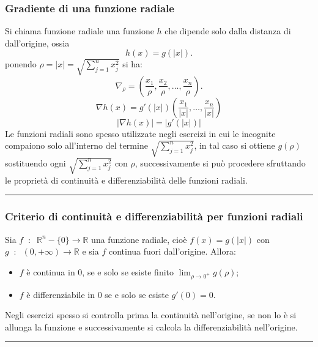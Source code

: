 \subsubsection*{Gradiente di una funzione radiale}
Si chiama funzione radiale una funzione $h$ che dipende solo dalla distanza di dall'origine, ossia
\[
    h(x) = g(|x|).
\]
ponendo $\rho = |x| = \sqrt{\sum_{j=1}^{n}x_j^2}$ si ha:
\[
    \nabla_\rho = ( \frac{x_1}{\rho}, \frac{x_2}{\rho}, \dots, \frac{x_n}{\rho}).
\]
\[
    \nabla h(x) = g'(|x|)( \frac{x_1}{|x|}, \dots, \frac{x_n}{|x|})
\]
\[
    |\nabla h(x)| = |g'(|x|)|
\]
Le funzioni radiali sono spesso utilizzate negli esercizi in cui le incognite compaiono solo all'interno del termine $\sqrt{\sum_{j=1}^{n}x_j^2}$, in tal caso si ottiene $g(\rho)$ sostituendo ogni $\sqrt{\sum_{j=1}^{n}x_j^2}$ con $ \rho$, successivamente si può procedere sfruttando le proprietà di continuità e differenziabilità delle funzioni radiali.\newline
\rule{\textwidth}{0.4pt}
\subsubsection*{Criterio di continuità e differenziabilità per funzioni radiali}
Sia $f \;\;:\;\; \mathbb{R}^n-\{0\} \rightarrow  \mathbb{R}$ una funzione radiale, cioè $f(x) = g(|x|)$ con $g \;\;:\;\;(0, +\infty) \rightarrow \mathbb{R}$ e sia $f$ continua fuori dall'origine. Allora:
\begin{itemize}
    \item $f$ è continua in $0$, se e solo se esiste finito $\lim_{\rho\rightarrow 0^+}g(\rho)$;
    \item $f$ è differenziabile in $0$ se e solo se esiste $g'(0)=0$.
\end{itemize}
Negli esercizi spesso si controlla prima la continuità nell'origine, se non lo è si allunga la funzione e successivamente si calcola la differenziabilità nell'origine.\newline
\rule{\textwidth}{0.4pt}
